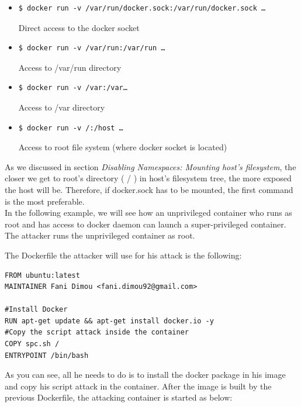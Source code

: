 \begin{itemize}
\item \begin{lstlisting}[style=dockercommands]
$ docker run -v /var/run/docker.sock:/var/run/docker.sock …
\end{lstlisting}
Direct access to the docker socket

\item \begin{lstlisting}[style=dockercommands]
$ docker run -v /var/run:/var/run …
\end{lstlisting}
Access to /var/run directory

\item \begin{lstlisting}[style=dockercommands]
$ docker run -v /var:/var…
\end{lstlisting}
Access to /var directory

\item \begin{lstlisting}[style=dockercommands]
$ docker run -v /:/host …
\end{lstlisting}
Access to root file system (where docker socket is located)
\end{itemize}

As we discussed in section \textit{Disabling Namespaces: Mounting host's filesystem}, the closer we get to root's directory ( / ) in host's filesystem tree, the more exposed the host will be. Therefore, if docker.sock has to be mounted, the first command is the most preferable.
\\
 
In the following example, we will see how an unprivileged container who runs as root and has access to docker daemon can launch a super-privileged container.
The attacker runs the unprivileged container as root. \cite{hosttakeover}

The Dockerfile the attacker will use for his attack is the following:

\begin{lstlisting}[style=Dockerfile, caption={Dockerfile used for spc\_example image}]
FROM ubuntu:latest
MAINTAINER Fani Dimou <fani.dimou92@gmail.com>

#Install Docker
RUN apt-get update && apt-get install docker.io -y
#Copy the script attack inside the container
COPY spc.sh /
ENTRYPOINT /bin/bash
\end{lstlisting}

As you can see, all he needs to do is to install the docker package in his image and copy his script attack in the container. After the image is built by the previous Dockerfile, the attacking container is started as below:

